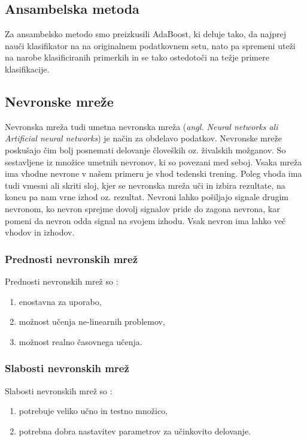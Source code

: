 \documentclass{acm_proc_article-sp}
\begin{document}
\subsection{Ansambelska metoda}
Za ansambelsko metodo smo preizkusili AdaBoost, ki deluje tako, da najprej nauči klasifikator na na originalnem podatkovnem setu, nato pa spremeni uteži na narobe klasificiranih primerkih in se tako ostedotoči na težje primere klasifikacije. \cite{SciAda}


\subsection{Nevronske mreže}
Nevronska mreža tudi umetna nevronska mreža (\textit{angl.
Neural networks ali Artificial neural networks}) je način za obdelavo podatkov.
Nevronske mreže poskušajo čim bolj posnemati delovanje človeških oz. živalskih možganov.
So sestavljene iz množice umetnih nevronov, ki so povezani med seboj.
Vsaka mreža ima vhodne nevrone v našem primeru je vhod tedenski trening.
Poleg vhoda ima tudi vmesni ali skriti sloj, kjer se nevronska mreža uči in izbira rezultate, na koncu pa nam vrne izhod oz. rezultat.
Nevroni lahko pošiljajo signale drugim nevronom, ko nevron sprejme dovolj signalov pride do zagona nevrona, kar pomeni da nevron odda signal na svojem izhodu.
Vsak nevron ima lahko več vhodov in izhodov.

\subsubsection{Prednosti nevronskih mrež}
Prednosti nevronskih mrež so \cite{nnetworks}:
\begin{enumerate}
\item{enostavna za uporabo,}
\item{možnost učenja ne-linearnih problemov,}
\item{možnost realno časovnega učenja.}
\end{enumerate}

\subsubsection{Slabosti nevronskih mrež}
Slabosti nevronskih mrež so \cite{nnetworks}:
\begin{enumerate}
\item{potrebuje veliko učno in testno množico,}
\item{potrebna dobra nastavitev parametrov za učinkovito delovanje.}
\end{enumerate}
\end{document}
